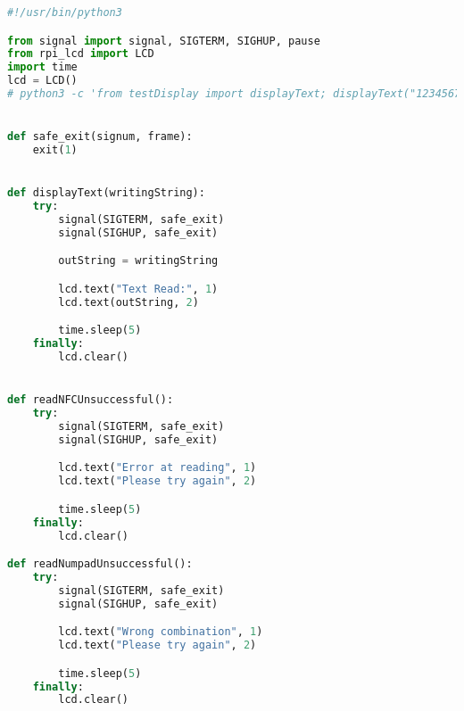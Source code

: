\begin{lstlisting}[language=Python, caption=Display code, label=lst:impl:display]
    #!/usr/bin/python3

from signal import signal, SIGTERM, SIGHUP, pause
from rpi_lcd import LCD
import time
lcd = LCD()
# python3 -c 'from testDisplay import displayText; displayText("123456789")'


def safe_exit(signum, frame):
    exit(1)


def displayText(writingString):
    try:
        signal(SIGTERM, safe_exit)
        signal(SIGHUP, safe_exit)

        outString = writingString

        lcd.text("Text Read:", 1)
        lcd.text(outString, 2)

        time.sleep(5)
    finally:
        lcd.clear()


def readNFCUnsuccessful():
    try:
        signal(SIGTERM, safe_exit)
        signal(SIGHUP, safe_exit)

        lcd.text("Error at reading", 1)
        lcd.text("Please try again", 2)

        time.sleep(5)
    finally:
        lcd.clear()

def readNumpadUnsuccessful():
    try:
        signal(SIGTERM, safe_exit)
        signal(SIGHUP, safe_exit)

        lcd.text("Wrong combination", 1)
        lcd.text("Please try again", 2)

        time.sleep(5)
    finally:
        lcd.clear()


    \end{lstlisting}